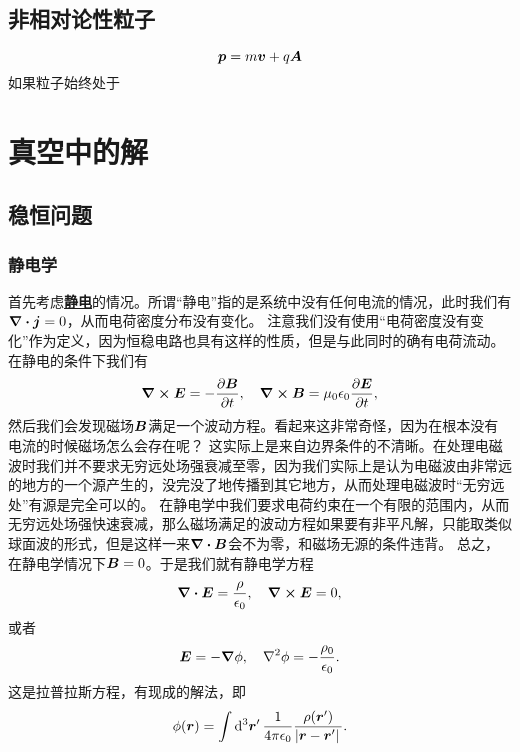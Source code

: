 \documentclass[UTF8, a4paper]{ctexart}
\newcommand*{\concept}[1]{\underline{\textbf{#1}}}
\begin{document}
\subsection{非相对论性粒子}

\begin{equation}
    \vb*{p} = m \vb*{v} + q \vb*{A}
\end{equation}
如果粒子始终处于

\section{真空中的解}

\subsection{稳恒问题}

\subsubsection{静电学}

首先考虑\concept{静电}的情况。所谓“静电”指的是系统中没有任何电流的情况，此时我们有$\div{\vb*{j}}=0$，从而电荷密度分布没有变化。
注意我们没有使用“电荷密度没有变化”作为定义，因为恒稳电路也具有这样的性质，但是与此同时的确有电荷流动。
在静电的条件下我们有
\[
    \curl{\vb*{E}} = - \pdv{\vb*{B}}{t}, \quad \curl{\vb*{B}} = \mu_0 \epsilon_0 \pdv{\vb*{E}}{t},
\]
然后我们会发现磁场$\vb*{B}$满足一个波动方程。看起来这非常奇怪，因为在根本没有电流的时候磁场怎么会存在呢？
这实际上是来自边界条件的不清晰。在处理电磁波时我们并不要求无穷远处场强衰减至零，因为我们实际上是认为电磁波由非常远的地方的一个源产生的，没完没了地传播到其它地方，从而处理电磁波时“无穷远处”有源是完全可以的。
在静电学中我们要求电荷约束在一个有限的范围内，从而无穷远处场强快速衰减，那么磁场满足的波动方程如果要有非平凡解，只能取类似球面波的形式，但是这样一来$\div{\vb*{B}}$会不为零，和磁场无源的条件违背。
总之，在静电学情况下$\vb*{B}=0$。于是我们就有静电学方程
\begin{equation}
    \div{\vb*{E}} = \frac{\rho}{\epsilon_0}, \quad \curl{\vb*{E}} = 0,
    \label{eq:static-e-field}
\end{equation}
或者
\begin{equation}
    \vb*{E} = - \grad{\phi}, \quad \laplacian{\phi} = - \frac{\rho_0}{\epsilon_0}.
    \label{eq:static-phi-field}
\end{equation}
这是拉普拉斯方程，有现成的解法，即
\begin{equation}
    \phi(\vb*{r}) = \int \dd[3]{\vb*{r}'} \frac{1}{4\pi \epsilon_0} \frac{\rho(\vb*{r}')}{\abs*{\vb*{r} - \vb*{r}'}}.
    \label{eq:from-q-to-phi}
\end{equation}
\end{document}
